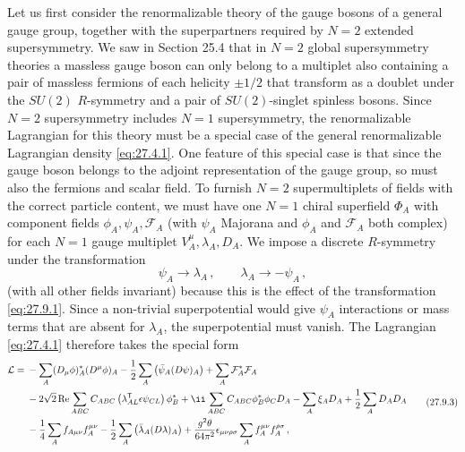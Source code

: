Let us first consider the renormalizable theory of the gauge bosons of a
general gauge group, together with the superpartners required by \(N=2\)
extended supersymmetry. We saw in Section 25.4 that in \(N=2\) global
supersymmetry theories a massless gauge boson can only belong to a multiplet
also containing a pair of massless fermions of each helicity
\(\mathord{\pm}1/2\) that transform as a doublet under the \(SU(2)\)
\(R\)-symmetry and a pair of \(SU(2)\)-singlet spinless bosons. Since \(N=2\)
supersymmetry includes \(N=1\) supersymmetry, the renormalizable Lagrangian
for this theory must be a special case of the general renormalizable
Lagrangian density \eqref{eq:27.4.1}. One feature of this special case is that
since the gauge boson belongs to the adjoint representation of the gauge
group, so must also the fermions and scalar field. To furnish \(N=2\)
supermultiplets of fields with the correct particle content, we must have one
\(N=1\) chiral superfield \(\Phi_A\) with component fields
\(\phi_A,\psi_A,\mathcal{F}_A\) (with \(\psi_A\) Majorana and \(\phi_A\) and
\(\mathcal{F}_A\) both complex) for each \(N=1\) gauge multiplet
\(V_A^\mu,\lambda_A,D_A\). We impose a discrete \(R\)-symmetry under the
transformation
\begin{equation}
  \psi_A\longrightarrow\lambda_A\,,
  \qquad
  \lambda_A\longrightarrow-\psi_A\,,
  \tag{27.9.2}\label{eq:27.9.2}
\end{equation}
(with all other fields invariant) because this is the effect of the
transformation \eqref{eq:27.9.1}. Since a non-trivial superpotential would
give \(\psi_A\) interactions or mass terms that are absent for \(\lambda_A\),
the superpotential must vanish. The Lagrangian \eqref{eq:27.4.1} therefore
takes the special form
\begin{equation}
  \begin{aligned}
  \mathcal{L}={}&
  -\sum_A(D_\mu\phi)_A^*(D^\mu\phi)_A
  -\frac12\sum_A\left(\bar\psi_A(\sl{D}\psi)_A\right)
  +\sum_A\mathcal{F}_A^*\mathcal{F}_A
  \\
  &-2\sqrt{2}\operatorname{Re}\sum_{ABC}
    C_{ABC}\left(\lambda_{AL}^{\mathsf T}\epsilon\psi_{CL}\right)\phi_B^*
  +\ii\sum_{ABC}C_{ABC}\phi_B^*\phi_CD_A
  -\sum_A\xi_AD_A+\frac12\sum_AD_AD_A
  \\
  &-\frac14\sum_Af_{A\mu\nu}f_A^{\mu\nu}
  -\frac12\sum_A\left(\bar\lambda_A(\sl{D}\lambda)_A\right)
  +\frac{g^2\theta}{64\pi^2}\epsilon_{\mu\nu\rho\sigma}
    \sum_Af_A^{\mu\nu}f_A^{\rho\sigma}\,,
  \end{aligned}
  \tag{27.9.3}\label{eq:27.9.3}
\end{equation}
